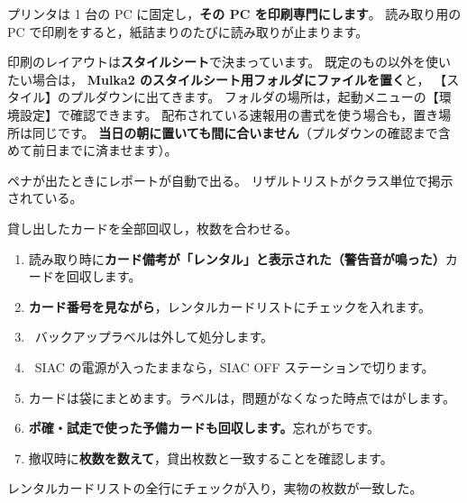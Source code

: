 \begin{Note}
プリンタは 1 台の PC に固定し，\textbf{その PC を印刷専門にします}。
読み取り用の PC で印刷をすると，紙詰まりのたびに読み取りが止まります。
\end{Note}

\begin{Note}
印刷のレイアウトは\textbf{スタイルシート}で決まっています。
既定のもの以外を使いたい場合は，
\textbf{Mulka2 のスタイルシート用フォルダにファイルを置く}と，
【スタイル】のプルダウンに出てきます。
フォルダの場所は，起動メニューの【環境設定】で確認できます。\ver
配布されている速報用の書式を使う場合も，置き場所は同じです。
\textbf{当日の朝に置いても間に合いません}（プルダウンの確認まで含めて前日までに済ませます）。
\end{Note}

\begin{Done}
ペナが出たときにレポートが自動で出る。
リザルトリストがクラス単位で掲示されている。
\end{Done}


\begin{Goal}
貸し出したカードを全部回収し，枚数を合わせる。
\end{Goal}

\begin{enumerate}
\item 読み取り時に\textbf{カード備考が「レンタル」と表示された（警告音が鳴った）}カードを回収します。
\item \textbf{カード番号を見ながら}，レンタルカードリストにチェックを入れます。
\item \tEMIT\ バックアップラベルは外して処分します。
\item \tSIAC\ SIAC の電源が入ったままなら，SIAC OFF ステーションで切ります。
\item カードは袋にまとめます。ラベルは，問題がなくなった時点ではがします。
\item \textbf{ポ確・試走で使った予備カードも回収します。}忘れがちです。
\item 撤収時に\textbf{枚数を数えて}，貸出枚数と一致することを確認します。
\end{enumerate}

\begin{Done}
レンタルカードリストの全行にチェックが入り，実物の枚数が一致した。
\end{Done}

